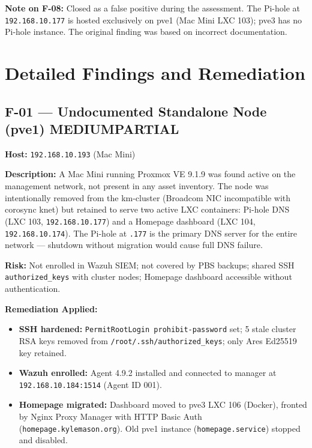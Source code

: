 \documentclass[11pt,a4paper]{article}
\newcommand{\medium}{\colorbox{medium}{\color{white}\small\textbf{MEDIUM}}}
\newcommand{\partialstatus}{\colorbox{partial}{\color{white}\small\textbf{PARTIAL}}}
\begin{document}
\vspace{0.5em}
\noindent\textbf{Note on F-08:} Closed as a false positive during the assessment. The
Pi-hole at \texttt{192.168.10.177} is hosted exclusively on pve1 (Mac Mini LXC 103); pve3
has no Pi-hole instance. The original finding was based on incorrect documentation.

\section{Detailed Findings and Remediation}

\subsection{F-01 — Undocumented Standalone Node (pve1) \quad \medium \quad \partialstatus}

\textbf{Host:} \texttt{192.168.10.193} (Mac Mini)

\textbf{Description:} A Mac Mini running Proxmox VE 9.1.9 was found active on the management
network, not present in any asset inventory. The node was intentionally removed from the
km-cluster (Broadcom NIC incompatible with corosync knet) but retained to serve two active
LXC containers: Pi-hole DNS (LXC 103, \texttt{192.168.10.177}) and a Homepage dashboard
(LXC 104, \texttt{192.168.10.174}). The Pi-hole at \texttt{.177} is the primary DNS server
for the entire network — shutdown without migration would cause full DNS failure.

\textbf{Risk:} Not enrolled in Wazuh SIEM; not covered by PBS backups; shared SSH
\texttt{authorized\_keys} with cluster nodes; Homepage dashboard accessible without
authentication.

\textbf{Remediation Applied:}
\begin{itemize}[nosep]
  \item \textbf{SSH hardened:} \texttt{PermitRootLogin prohibit-password} set; 5 stale cluster RSA
    keys removed from \texttt{/root/.ssh/authorized\_keys}; only Ares Ed25519 key retained.
  \item \textbf{Wazuh enrolled:} Agent 4.9.2 installed and connected to manager at
    \texttt{192.168.10.184:1514} (Agent ID 001).
  \item \textbf{Homepage migrated:} Dashboard moved to pve3 LXC 106 (Docker), fronted by
    Nginx Proxy Manager with HTTP Basic Auth (\texttt{homepage.kylemason.org}).
    Old pve1 instance (\texttt{homepage.service}) stopped and disabled.
\end{itemize}
\end{document}
